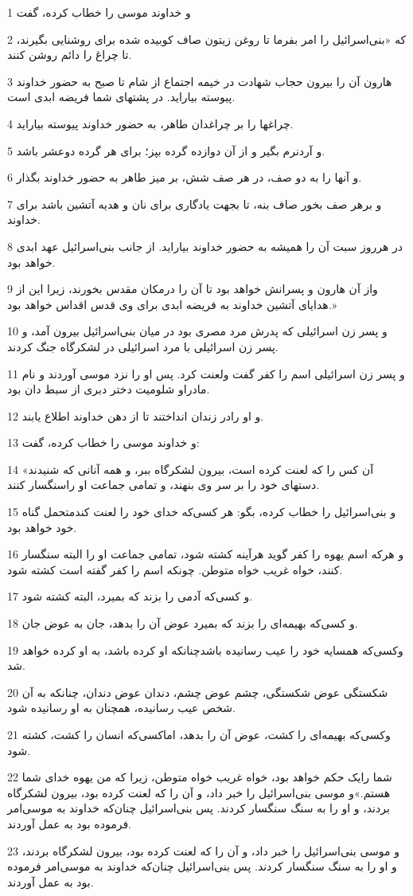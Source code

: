 \par 1 و خداوند موسی را خطاب کرده، گفت
\par 2 که «بنی‌اسرائیل را امر بفرما تا روغن زیتون صاف کوبیده شده برای روشنایی بگیرند، تا چراغ را دائم روشن کنند.
\par 3 هارون آن را بیرون حجاب شهادت در خیمه اجتماع از شام تا صبح به حضور خداوند پیوسته بیاراید. در پشتهای شما فریضه ابدی است.
\par 4 چراغها را بر چراغدان طاهر، به حضور خداوند پیوسته بیاراید.
\par 5 و آردنرم بگیر و از آن دوازده گرده بپز؛ برای هر گرده دوعشر باشد.
\par 6 و آنها را به دو صف، در هر صف شش، بر میز طاهر به حضور خداوند بگذار.
\par 7 و برهر صف بخور صاف بنه، تا بجهت یادگاری برای نان و هدیه آتشین باشد برای خداوند.
\par 8 در هرروز سبت آن را همیشه به حضور خداوند بیاراید. از جانب بنی‌اسرائیل عهد ابدی خواهد بود.
\par 9 واز آن هارون و پسرانش خواهد بود تا آن را درمکان مقدس بخورند، زیرا این از هدایای آتشین خداوند به فریضه ابدی برای وی قدس اقداس خواهد بود.»
\par 10 و پسر زن اسرائیلی که پدرش مرد مصری بود در میان بنی‌اسرائیل بیرون آمد، و پسر زن اسرائیلی با مرد اسرائیلی در لشکرگاه جنگ کردند.
\par 11 و پسر زن اسرائیلی اسم را کفر گفت ولعنت کرد. پس او را نزد موسی آوردند و نام مادراو شلومیت دختر دبری از سبط دان بود.
\par 12 و او رادر زندان انداختند تا از دهن خداوند اطلاع یابند.
\par 13 و خداوند موسی را خطاب کرده، گفت:
\par 14 «آن کس را که لعنت کرده است، بیرون لشکرگاه ببر، و همه آنانی که شنیدند دستهای خود را بر سر وی بنهند، و تمامی جماعت او راسنگسار کنند.
\par 15 و بنی‌اسرائیل را خطاب کرده، بگو: هر کسی‌که خدای خود را لعنت کندمتحمل گناه خود خواهد بود.
\par 16 و هر‌که اسم یهوه را کفر گوید هرآینه کشته شود، تمامی جماعت او را البته سنگسار کنند، خواه غریب خواه متوطن. چونکه اسم را کفر گفته است کشته شود.
\par 17 و کسی‌که آدمی را بزند که بمیرد، البته کشته شود.
\par 18 و کسی‌که بهیمه‌ای را بزند که بمیرد عوض آن را بدهد، جان به عوض جان.
\par 19 وکسی‌که همسایه خود را عیب رسانیده باشدچنانکه او کرده باشد، به او کرده خواهد شد.
\par 20 شکستگی عوض شکستگی، چشم عوض چشم، دندان عوض دندان، چنانکه به آن شخص عیب رسانیده، همچنان به او رسانیده شود.
\par 21 وکسی‌که بهیمه‌ای را کشت، عوض آن را بدهد، اماکسی‌که انسان را کشت، کشته شود.
\par 22 شما رایک حکم خواهد بود، خواه غریب خواه متوطن، زیرا که من یهوه خدای شما هستم.»و موسی بنی‌اسرائیل را خبر داد، و آن را که لعنت کرده بود، بیرون لشکرگاه بردند، و او را به سنگ سنگسار کردند. پس بنی‌اسرائیل چنان‌که خداوند به موسی‌امر فرموده بود به عمل آوردند.
\par 23 و موسی بنی‌اسرائیل را خبر داد، و آن را که لعنت کرده بود، بیرون لشکرگاه بردند، و او را به سنگ سنگسار کردند. پس بنی‌اسرائیل چنان‌که خداوند به موسی‌امر فرموده بود به عمل آوردند.
 
